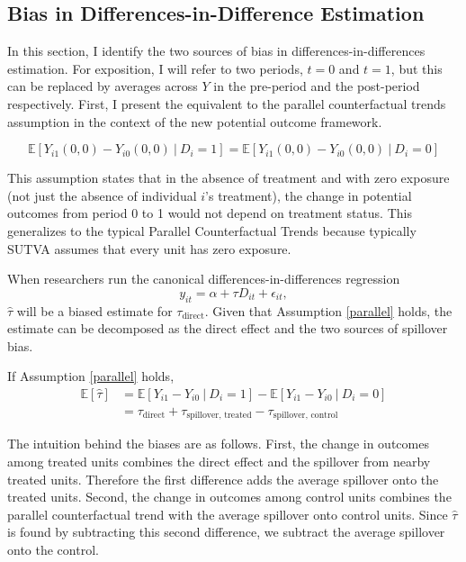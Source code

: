 \documentclass[11pt]{article}
\begin{document}
\subsection{Bias in Differences-in-Difference Estimation}

In this section, I identify the two sources of bias in differences-in-differences estimation. For exposition, I will refer to two periods, $t = 0$ and $t = 1$, but this can be replaced by averages across $Y$ in the pre-period and the post-period respectively. First, I present the equivalent to the parallel counterfactual trends assumption in the context of the new potential outcome framework. 

\begin{assumption}\label{parallel}
    \[ 
        \mathbb{E}\left[ Y_{i1}(0, 0) - Y_{i0}(0, 0) \ \vert \ D_i = 1 \right] = 
        \mathbb{E}\left[ Y_{i1}(0, 0) - Y_{i0}(0, 0) \ \vert \ D_i = 0 \right]
    \]
\end{assumption}

This assumption states that in the absence of treatment and with zero exposure (not just the absence of individual $i$'s treatment), the change in potential outcomes from period 0 to 1 would not depend on treatment status. This generalizes to the typical Parallel Counterfactual Trends because typically SUTVA assumes that every unit has zero exposure.

When researchers run the canonical differences-in-differences regression \[ 
    y_{it}  = \alpha + \tau D_{it} + \epsilon_{it},
\]
$\hat{\tau}$ will be a biased estimate for $\tau_{\text{direct}}$.
Given that Assumption \ref{parallel} holds, the estimate can be decomposed as the direct effect and the two sources of spillover bias.

\begin{theorem}
    \label{thm:bias}
    If Assumption \ref{parallel} holds, 
    \begin{align*}
        \mathbb{E}[\hat{\tau}] &= \mathbb{E}\left[ Y_{i1} - Y_{i0} \ \vert \ D_i = 1 \right] - \mathbb{E}\left[ Y_{i1} - Y_{i0} \ \vert \ D_i = 0 \right] \\ 
        &= \tau_{\text{direct}} + \tau_{\text{spillover, treated}} - \tau_{\text{spillover, control}}
    \end{align*}
\end{theorem}

The intuition behind the biases are as follows. First, the change in outcomes among treated units combines the direct effect and the spillover from nearby treated units. Therefore the first difference adds the average spillover onto the treated units. Second, the change in outcomes among control units combines the parallel counterfactual trend with the average spillover onto control units. Since $\hat{\tau}$ is found by subtracting this second difference, we subtract the average spillover onto the control. 
\end{document}
